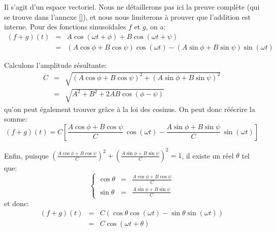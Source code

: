 Il s'agit d'un espace vectoriel.
Nous ne détaillerons pas ici la preuve complète
(qui se trouve dans l'annexe \ref{}),
et nous nous limiterons à prouver que l'addition est interne.
Pour des fonctions sinusoïdales $f$ et $g$, on a:
\[
    \begin{array}{rcl}
        (f+g)(t) &=& A\cos(\omega t + \phi) + B\cos(\omega t + \psi) \\
                 &=& (A\cos\phi+B\cos\psi)\cos(\omega t)
                     - (A\sin\phi+B\sin\psi)\sin(\omega t)
    \end{array}
\]

Calculons l'amplitude résultante:
\[
    \begin{array}{rcl}
        C &=& \sqrt{(A\cos\phi+B\cos\psi)^2+(A\sin\phi+B\sin\psi)^2} \\
          &=& \sqrt{A^2+B^2+2AB\cos(\phi-\psi)}
    \end{array}
\]
qu'on peut également trouver grâce à la loi des cosinus.
On peut donc réécrire la somme:
\[
    (f+g)(t) = C\left[ \frac{A\cos\phi+B\cos\psi}{C}\, \cos(\omega t)
                     - \frac{A\sin\phi+B\sin\psi}{C}\, \sin(\omega t) \right]
\]

Enfin, puisque $\left( \frac{A\cos\phi+B\cos\psi}{C} \right)^2
+ \left( \frac{A\sin\phi+B\sin\psi}{C} \right)^2 = 1$,
il existe un réel $\theta$ tel que:
\[
    \left\{
    \begin{array}{rcl}
        \cos\theta &=& \frac{A\cos\phi+B\cos\psi}{C} \\
        \sin\theta &=& \frac{A\sin\phi+B\sin\psi}{C}
    \end{array}
    \right.
\]
et donc:
\[
    \begin{array}{rcl}
        (f+g)(t) &=& C ( \cos\theta\cos(\omega t)
                       - \sin\theta\sin(\omega t) ) \\
                 &=& C\cos(\omega t + \theta)
    \end{array}
\]

